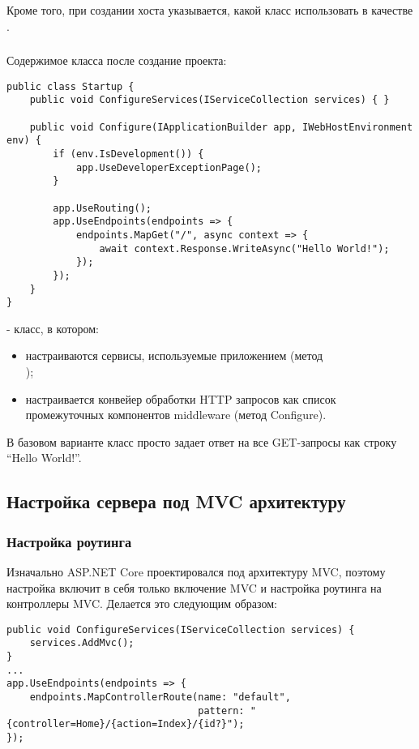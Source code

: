 \documentclass[a4paper,14pt]{extarticle}
\begin{document}
Кроме того, при создании хоста указывается, какой класс использовать в качестве
.

\subsubsection{}

Содержимое класса  после создание проекта:

\begin{lstlisting}
public class Startup {
    public void ConfigureServices(IServiceCollection services) { }

    public void Configure(IApplicationBuilder app, IWebHostEnvironment env) {
        if (env.IsDevelopment()) {
            app.UseDeveloperExceptionPage();
        }

        app.UseRouting();
        app.UseEndpoints(endpoints => {
            endpoints.MapGet("/", async context => {
                await context.Response.WriteAsync("Hello World!");
            });
        });
    }
}
\end{lstlisting}

 - класс, в котором:

\begin{itemize}
    \item настраиваются сервисы, используемые приложением (метод\\
          );
    \item настраивается конвейер обработки HTTP запросов как список
          промежуточных компонентов middleware (метод Configure).
\end{itemize}

В базовом варианте класс просто задает ответ на все GET-запросы как строку
\enquote{Hello World!}.

\subsection{Настройка сервера под MVC архитектуру}
\subsubsection{Настройка роутинга}

Изначально ASP.NET Core проектировался под архитектуру MVC, поэтому настройка
включит в себя только включение MVC и настройка роутинга на контроллеры
MVC. Делается это следующим образом:

\begin{lstlisting}
public void ConfigureServices(IServiceCollection services) {
    services.AddMvc();
}
...
app.UseEndpoints(endpoints => {
    endpoints.MapControllerRoute(name: "default",
                                 pattern: "{controller=Home}/{action=Index}/{id?}");
});
\end{lstlisting}
\end{document}
